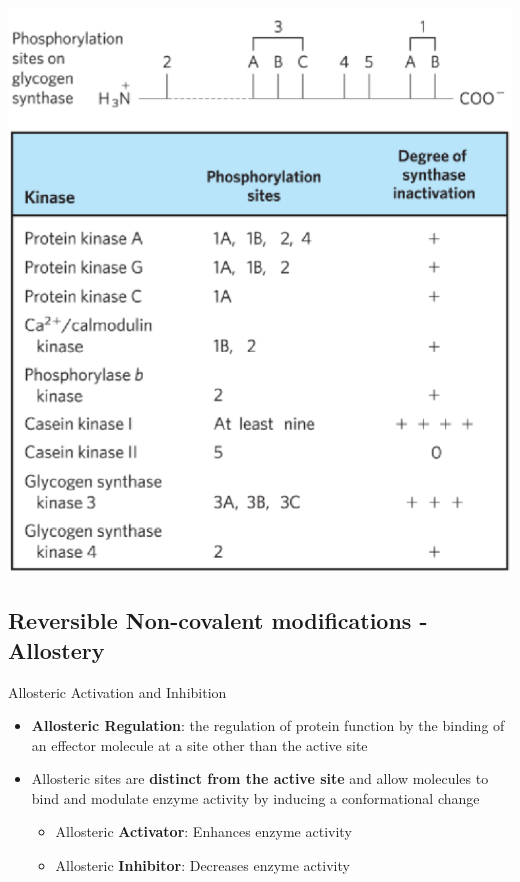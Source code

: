 \documentclass[10pt]{article}
\begin{document}
\begin{center}
    \includegraphics*[scale=0.6]{L1_16.png}
\end{center}    

\subsection*{Reversible Non-covalent modifications - Allostery}
Allosteric Activation and Inhibition
\begin{itemize}
    \item \textbf{Allosteric Regulation}: the regulation of protein function by the binding of an effector molecule at a site other than the active site
    \item Allosteric sites are \textbf{distinct from the active site} and allow molecules to bind and modulate enzyme activity by inducing a conformational change
    \begin{itemize}
        \item Allosteric \textbf{Activator}: Enhances enzyme activity
        \item Allosteric \textbf{Inhibitor}: Decreases enzyme activity
    \end{itemize}
\end{itemize}
\end{document}
